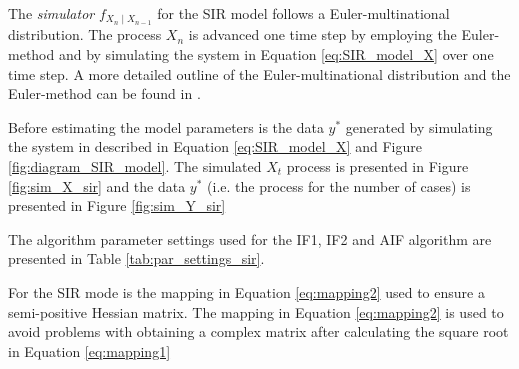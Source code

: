 \documentclass[twoside,openright]{report}
\begin{document}

The  \textit{simulator} $f_{X_n \mid X_{n-1}}$ for the SIR model follows a Euler-multinational distribution. The process $X_n$ is advanced one time step by employing the Euler-method and by simulating the system in Equation \ref{eq:SIR_model_X} over one time step. A more detailed outline of the Euler-multinational distribution and the Euler-method can be found in \cite{king2015statistical}.  

Before estimating the model parameters is the  data $y^{*}$   generated by simulating the system in described in Equation \ref{eq:SIR_model_X} and Figure \ref{fig:diagram_SIR_model}. The simulated $X_t$ process is presented in Figure \ref{fig:sim_X_sir} and the data $y^{*}$ (i.e. the process for the number of cases) is presented in Figure \ref{fig:sim_Y_sir}

The algorithm parameter settings used for the IF1, IF2 and AIF algorithm are presented in Table \ref{tab:par_settings_sir}.

For the SIR mode is the mapping in Equation \ref{eq:mapping2} used to ensure a semi-positive Hessian matrix. The mapping in Equation  \ref{eq:mapping2} is used to avoid problems with obtaining a complex matrix after calculating the square root in Equation \ref{eq:mapping1}
\end{document}
